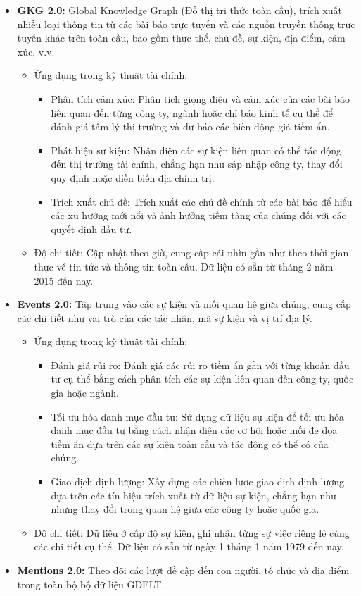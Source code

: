 \begin{itemize}
\item
  \textbf{GKG 2.0:} Global Knowledge Graph (Đồ thị tri thức toàn cầu), trích xuất nhiều loại thông tin từ các bài báo trực tuyến và các nguồn truyền thông trực tuyến khác trên toàn cầu, bao gồm thực thể, chủ đề, sự kiện, địa điểm, cảm xúc, v.v.

  \begin{itemize}
  \item
    Ứng dụng trong kỹ thuật tài chính:

    \begin{itemize}
        \item
      Phân tích cảm xúc: Phân tích giọng điệu và cảm xúc của các bài báo liên quan đến từng công ty, ngành hoặc chỉ báo kinh tế cụ thể để đánh giá tâm lý thị trường và dự báo các biến động giá tiềm ẩn.
    \item
      Phát hiện sự kiện: Nhận diện các sự kiện liên quan có thể tác động đến thị trường tài chính, chẳng hạn như sáp nhập công ty, thay đổi quy định hoặc diễn biến địa chính trị.
    \item
      Trích xuất chủ đề: Trích xuất các chủ đề chính từ các bài báo để hiểu các xu hướng mới nổi và ảnh hưởng tiềm tàng của chúng đối với các quyết định đầu tư.
    \end{itemize}
  \item
    Độ chi tiết: Cập nhật theo giờ, cung cấp cái nhìn gần như theo thời gian thực về tin tức và thông tin toàn cầu. Dữ liệu có sẵn từ tháng 2 năm 2015 đến nay.
  \end{itemize}
\item
  \textbf{Events 2.0:} Tập trung vào các sự kiện và mối quan hệ giữa chúng, cung cấp các chi tiết như vai trò của các tác nhân, mã sự kiện và vị trí địa lý.

  \begin{itemize}
  \item
    Ứng dụng trong kỹ thuật tài chính:

    \begin{itemize}
        \item
      Đánh giá rủi ro: Đánh giá các rủi ro tiềm ẩn gắn với từng khoản đầu tư cụ thể bằng cách phân tích các sự kiện liên quan đến công ty, quốc gia hoặc ngành.
    \item
      Tối ưu hóa danh mục đầu tư: Sử dụng dữ liệu sự kiện để tối ưu hóa danh mục đầu tư bằng cách nhận diện các cơ hội hoặc mối đe dọa tiềm ẩn dựa trên các sự kiện toàn cầu và tác động có thể có của chúng.
    \item
      Giao dịch định lượng: Xây dựng các chiến lược giao dịch định lượng dựa trên các tín hiệu trích xuất từ dữ liệu sự kiện, chẳng hạn như những thay đổi trong quan hệ giữa các công ty hoặc quốc gia.
    \end{itemize}
  \item
    Độ chi tiết: Dữ liệu ở cấp độ sự kiện, ghi nhận từng sự việc riêng lẻ cùng các chi tiết cụ thể. Dữ liệu có sẵn từ ngày 1 tháng 1 năm 1979 đến nay.
  \end{itemize}
\item
  \textbf{Mentions 2.0:} Theo dõi các lượt đề cập đến con người, tổ chức và địa điểm trong toàn bộ bộ dữ liệu GDELT.


\end{itemize}
